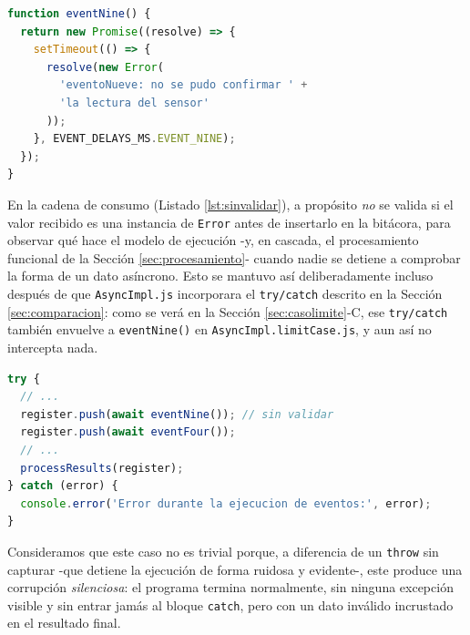 \documentclass[conference,a4paper]{IEEEtran}
\begin{document}
\begin{lstlisting}[language=JavaScript, caption={Evento l\'imite: resuelve con un \texttt{Error} en lugar de rechazar (PromiseImpl.limitCase.js).}, label={lst:eventonueve}]
function eventNine() {
  return new Promise((resolve) => {
    setTimeout(() => {
      resolve(new Error(
        'eventoNueve: no se pudo confirmar ' +
        'la lectura del sensor'
      ));
    }, EVENT_DELAYS_MS.EVENT_NINE);
  });
}
\end{lstlisting}

En la cadena de consumo (Listado \ref{lst:sinvalidar}), a prop\'osito \emph{no} se valida si el valor recibido es una instancia de \texttt{Error} antes de insertarlo en la bit\'acora, para observar qu\'e hace el modelo de ejecuci\'on -y, en cascada, el procesamiento funcional de la Secci\'on \ref{sec:procesamiento}- cuando nadie se detiene a comprobar la forma de un dato as\'incrono. Esto se mantuvo as\'i deliberadamente incluso despu\'es de que \texttt{AsyncImpl.js} incorporara el \texttt{try/catch} descrito en la Secci\'on \ref{sec:comparacion}: como se ver\'a en la Secci\'on \ref{sec:casolimite}-C, ese \texttt{try/catch} tambi\'en envuelve a \texttt{eventNine()} en \texttt{AsyncImpl.limitCase.js}, y aun as\'i no intercepta nada.

\begin{lstlisting}[language=JavaScript, caption={Consumo sin validar, ya dentro del bloque try incorporado por el grupo (AsyncImpl.limitCase.js).}, label={lst:sinvalidar}]
try {
  // ...
  register.push(await eventNine()); // sin validar
  register.push(await eventFour());
  // ...
  processResults(register);
} catch (error) {
  console.error('Error durante la ejecucion de eventos:', error);
}
\end{lstlisting}

Consideramos que este caso no es trivial porque, a diferencia de un \texttt{throw} sin capturar -que detiene la ejecuci\'on de forma ruidosa y evidente-, este produce una corrupci\'on \emph{silenciosa}: el programa termina normalmente, sin ninguna excepci\'on visible y sin entrar jam\'as al bloque \texttt{catch}, pero con un dato inv\'alido incrustado en el resultado final.
\end{document}
